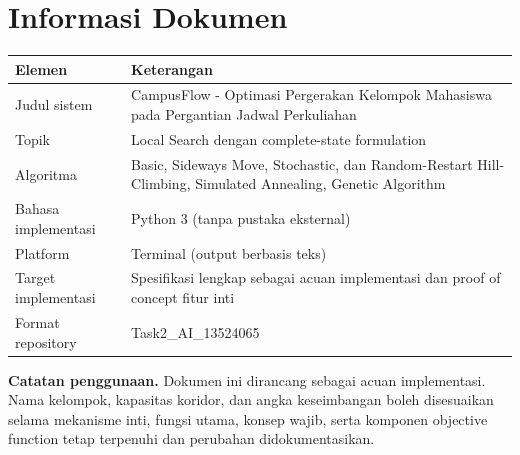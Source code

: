 \documentclass[11pt,a4paper]{article}
\begin{document}
\newpage

\section*{\Large\bfseries Informasi Dokumen}

\begin{tabularx}{\textwidth}{|l|>{\raggedright\arraybackslash}X|}
\hline
\textbf{Elemen} & \textbf{Keterangan} \\
\hline
Judul sistem & CampusFlow - Optimasi Pergerakan Kelompok Mahasiswa pada Pergantian Jadwal Perkuliahan \\
\hline
Topik & Local Search dengan complete-state formulation \\
\hline
Algoritma & Basic, Sideways Move, Stochastic, dan Random-Restart Hill-Climbing, Simulated Annealing, Genetic Algorithm \\
\hline
Bahasa implementasi & Python 3 (tanpa pustaka eksternal) \\
\hline
Platform & Terminal (output berbasis teks) \\
\hline
Target implementasi & Spesifikasi lengkap sebagai acuan implementasi dan proof of concept fitur inti \\
\hline
Format repository & Task2\_AI\_13524065 \\
\hline
\end{tabularx}

\vspace{0.8em}
\textbf{Catatan penggunaan.} Dokumen ini dirancang sebagai acuan implementasi. Nama kelompok, kapasitas koridor, dan angka keseimbangan boleh disesuaikan selama mekanisme inti, fungsi utama, konsep wajib, serta komponen objective function tetap terpenuhi dan perubahan didokumentasikan.
\end{document}
